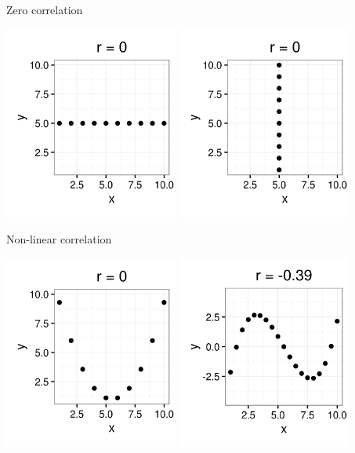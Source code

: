 \documentclass[xcolor=table, aspectratio=169, bigger, handout]{beamer}
\begin{document}
\begin{frame}{Zero correlation}

{\centering
\includegraphics[width=2.25in]{../images/ch10_cor_zero}
\includegraphics[width=2.25in]{../images/ch10_cor_zerox}
\par}
\end{frame}

\begin{frame}{Non-linear correlation}

{\centering
\includegraphics[width=2.25in]{../images/ch10_cor_para}
\pause\includegraphics[width=2.25in]{../images/ch10_cor_cube}
\par}
\end{frame}
\end{document}
